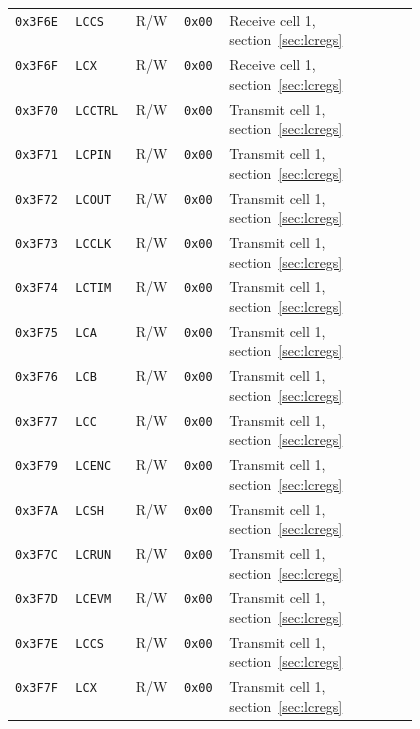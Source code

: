 \begin{longtable}{@{}llllp{0.47\linewidth}@{}}
\texttt{0x3F6E} & \texttt{LCCS} & R/W & \texttt{0x00} & Receive cell 1, section~\ref{sec:lcregs} \\
\texttt{0x3F6F} & \texttt{LCX} & R/W & \texttt{0x00} & Receive cell 1, section~\ref{sec:lcregs} \\
\midrule
\texttt{0x3F70} & \texttt{LCCTRL} & R/W & \texttt{0x00} & Transmit cell 1, section~\ref{sec:lcregs} \\
\texttt{0x3F71} & \texttt{LCPIN} & R/W & \texttt{0x00} & Transmit cell 1, section~\ref{sec:lcregs} \\
\texttt{0x3F72} & \texttt{LCOUT} & R/W & \texttt{0x00} & Transmit cell 1, section~\ref{sec:lcregs} \\
\texttt{0x3F73} & \texttt{LCCLK} & R/W & \texttt{0x00} & Transmit cell 1, section~\ref{sec:lcregs} \\
\texttt{0x3F74} & \texttt{LCTIM} & R/W & \texttt{0x00} & Transmit cell 1, section~\ref{sec:lcregs} \\
\texttt{0x3F75} & \texttt{LCA} & R/W & \texttt{0x00} & Transmit cell 1, section~\ref{sec:lcregs} \\
\texttt{0x3F76} & \texttt{LCB} & R/W & \texttt{0x00} & Transmit cell 1, section~\ref{sec:lcregs} \\
\texttt{0x3F77} & \texttt{LCC} & R/W & \texttt{0x00} & Transmit cell 1, section~\ref{sec:lcregs} \\
\texttt{0x3F79} & \texttt{LCENC} & R/W & \texttt{0x00} & Transmit cell 1, section~\ref{sec:lcregs} \\
\texttt{0x3F7A} & \texttt{LCSH} & R/W & \texttt{0x00} & Transmit cell 1, section~\ref{sec:lcregs} \\
\texttt{0x3F7C} & \texttt{LCRUN} & R/W & \texttt{0x00} & Transmit cell 1, section~\ref{sec:lcregs} \\
\texttt{0x3F7D} & \texttt{LCEVM} & R/W & \texttt{0x00} & Transmit cell 1, section~\ref{sec:lcregs} \\
\texttt{0x3F7E} & \texttt{LCCS} & R/W & \texttt{0x00} & Transmit cell 1, section~\ref{sec:lcregs} \\
\texttt{0x3F7F} & \texttt{LCX} & R/W & \texttt{0x00} & Transmit cell 1, section~\ref{sec:lcregs} \\
\end{longtable}
